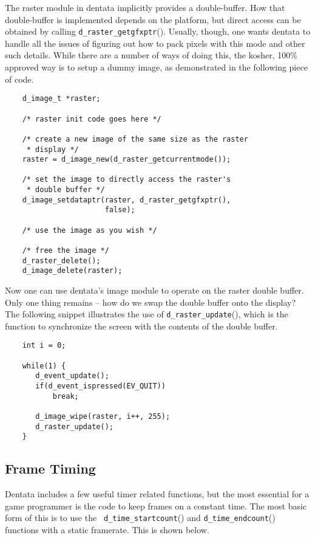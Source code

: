 The raster module in dentata implicitly provides a double-buffer. How
that double-buffer is implemented depends on the platform, but direct
access can be obtained by calling {\tt d\_raster\_getgfxptr}(). Usually,
though, one wants dentata to handle all the issues of figuring out how
to pack pixels with this mode and other such details. While there are a
number of ways of doing this, the kosher, 100\% approved way is to setup
a dummy image, as demonstrated in the following piece of code.

\begin{verbatim}
    d_image_t *raster;

    /* raster init code goes here */

    /* create a new image of the same size as the raster
     * display */
    raster = d_image_new(d_raster_getcurrentmode());

    /* set the image to directly access the raster's
     * double buffer */
    d_image_setdataptr(raster, d_raster_getgfxptr(),
                       false);

    /* use the image as you wish */

    /* free the image */
    d_raster_delete();
    d_image_delete(raster);
\end{verbatim}

Now one can use dentata's image module to operate on the raster
double buffer. Only one thing remains -- how do we swap the double
buffer onto the display? The following snippet illustrates the use
of {\tt d\_raster\_update}(), which is the function to synchronize the
screen with the contents of the double buffer.

\begin{verbatim}
    int i = 0;

    while(1) {
       d_event_update();
       if(d_event_ispressed(EV_QUIT))
           break;

       d_image_wipe(raster, i++, 255);
       d_raster_update();
    }
\end{verbatim}

\subsection{Frame Timing}

Dentata includes a few useful timer related functions, but the most
essential for a game programmer is the code to keep frames on a
constant time. The most basic form of this is to use the {\tt
d\_time\_startcount}() and {\tt d\_time\_endcount}() functions with a
static framerate. This is shown below.

